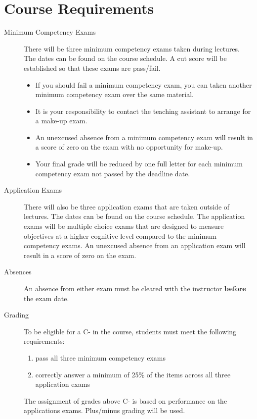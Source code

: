 \documentclass[11pt,article,oneside]{memoir}
\newcounter{schedule}
\begin{document}
\section*{Course Requirements}
\begin{description}
\item[Minimum Competency Exams] There will be three minimum competency exams taken during lectures. The dates can be found on the course schedule. A cut score will be established so that these exams are pass/fail. 
  \begin{itemize}
    \item If you should fail a minimum competency exam, you can taken another minimum competency exam over the same material.
    \item It is your responsibility to contact the teaching assistant to arrange for a make-up exam.
    \item An unexcused absence from a minimum competency exam will result in a score of zero on the exam with no opportunity for make-up.
    \item Your final grade will be reduced by one full letter for each minimum competency exam not passed by the deadline date.
  \end{itemize}
\item[Application Exams] There will also be three application exams that are taken outside of lectures. The dates can be found on the course schedule. The application exams will be multiple choice exams that are designed to measure objectives at a higher cognitive level compared to the minimum competency exams. An unexcused absence from an application exam will result in a score of zero on the exam.
\item[Absences] An absence from either exam must be cleared with the instructor \textbf{before} the exam date. 
\item[Grading] To be eligible for a C- in the course, students must meet the following requirements:
  \begin{enumerate}[label={(\alph*)}]
   \item pass all three minimum competency exams
   \item correctly answer a minimum of 25\% of the items across all three application exams
  \end{enumerate}
  The assignment of grades above C- is based on performance on the applications exams. Plus/minus grading will be used.
\end{description}
\end{document}
